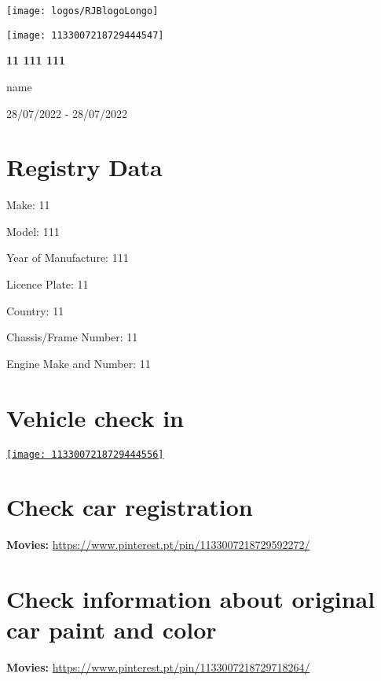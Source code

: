 \begin{center}
\texttt{[image: logos/RJBlogoLongo]}

\vspace*{1.25in}
\texttt{[image: 1133007218729444547]}

\vspace*{0.4in}
\huge{\textbf{11 111 111}}

\vspace*{0.2in}
\begin{large}
name

28/07/2022 - 28/07/2022
\end{large}
\end{center}
\newpage
\tableofcontents
\newpage
\section{Registry Data}
\begin{Large}
\begin{spacing}{2}
Make: 11

Model: 111

Year of Manufacture: 111

Licence Plate: 11

Country: 11

Chassis/Frame Number: 11

Engine Make and Number: 11
\end{spacing}
\end{Large}
\newpage
\section{Vehicle check in}
\begin{multicols}{2}
\href{https://i.pinimg.com/originals/e5/63/ea/e563eadf806ba73536b6018a587402b8.jpg}{\texttt{[image: 1133007218729444556]}}
\end{multicols}
\newpage
\section{Check car registration}
\textbf{Movies:}
\url{https://www.pinterest.pt/pin/1133007218729592272/}

\vspace*{0.2in}
\newpage
\section{Check information about original car paint and color}
\textbf{Movies:}
\url{https://www.pinterest.pt/pin/1133007218729718264/}

